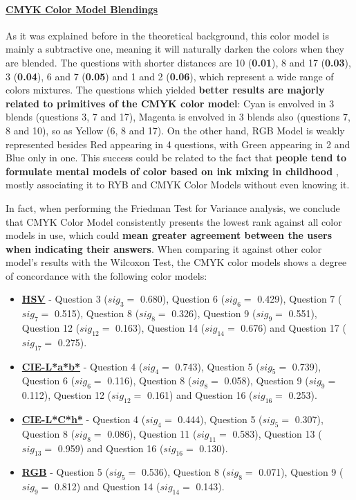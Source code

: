 \paragraph{\ul{CMYK Color Model Blendings}}
\label{par:cmykcolormodel}
%
As it was explained before in the theoretical background, this color model is mainly a subtractive one, meaning it will naturally darken the colors when they are blended. The questions with shorter distances are 10 (\textbf{0.01}), 8 and 17 (\textbf{0.03}), 3 (\textbf{0.04}), 6 and 7 (\textbf{0.05})
and 1 and 2 (\textbf{0.06}), which represent a wide range of colors mixtures. The questions which yielded \textbf{better results are majorly related to primitives of the CMYK color model}: Cyan is envolved in 3 blends (questions 3, 7 and 17), Magenta is envolved in 3 blends also (questions 7, 8 and
10), so as Yellow (6, 8 and 17). On the other hand, RGB Model is weakly represented besides Red appearing in 4 questions, with Green appearing in 2 and Blue only in one. This success could be related to the fact that \textbf{people tend to formulate mental models of color based on ink mixing in childhood}
\cite{Gossett2004}, mostly associating it to \gls{RYB} and CMYK Color Models without even knowing it. \par
%
In fact, when performing the Friedman Test for Variance analysis, we conclude that CMYK Color Model consistently presents the lowest rank against all color models in use, which could \textbf{mean greater agreement between the users when indicating their answers}. When comparing it against other color model's
results with the Wilcoxon Test, the CMYK color models shows a degree of concordance with the following color models:
%
\begin{itemize}
  \item \textbf{\ul{HSV}} - Question 3 ($sig_{3} = $ 0.680), Question 6 ($sig_{6} = $ 0.429), Question 7 ($sig_{7} = $ 0.515), Question 8 ($sig_{8} = $ 0.326), Question 9 ($sig_{9} = $ 0.551), Question 12 ($sig_{12} = $ 0.163), Question 14 ($sig_{14} = $ 0.676) and Question 17 ($sig_{17} = $ 0.275).
  \item \textbf{\ul{CIE-L*a*b*}} - Question 4 ($sig_{4} = $ 0.743), Question 5 ($sig_{5} = $ 0.739), Question 6 ($sig_{6} = $ 0.116), Question 8 ($sig_{8} = $ 0.058), Question 9 ($sig_{9} = $ 0.112), Question 12 ($sig_{12} = $ 0.161) and Question 16 ($sig_{16} = $ 0.253).
  \item \textbf{\ul{CIE-L*C*h*}} - Question 4 ($sig_{4} = $ 0.444), Question 5 ($sig_{5} = $ 0.307), Question 8 ($sig_{8} = $ 0.086), Question 11 ($sig_{11} = $ 0.583), Question 13 ($sig_{13} = $ 0.959) and Question 16 ($sig_{16} = $ 0.130).
  \item \textbf{\ul{RGB}} - Question 5 ($sig_{5} = $ 0.536), Question 8 ($sig_{8} = $ 0.071), Question 9 ($sig_{9} = $ 0.812) and Question 14 ($sig_{14} = $ 0.143).
\end{itemize}
